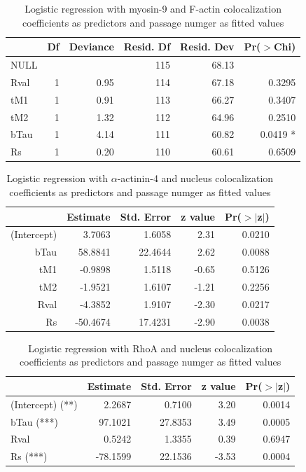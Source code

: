 \documentclass[english,authoryear]{elsarticle}
\begin{document}
\begin{table}[ht]
  \caption{Logistic regression with myosin-9 and F-actin colocalization coefficients as predictors and passage numger as fitted values}
  \label{glm-M9-Fact}
\centering
\begin{tabular}{lrrrrr}
  \hline
 & Df & Deviance & Resid. Df & Resid. Dev & Pr($>$Chi) \\
  \hline
NULL &  &  & 115 & 68.13 &  \\
  Rval & 1 & 0.95 & 114 & 67.18 & 0.3295 \\
  tM1 & 1 & 0.91 & 113 & 66.27 & 0.3407 \\
  tM2 & 1 & 1.32 & 112 & 64.96 & 0.2510 \\
  bTau & 1 & 4.14 & 111 & 60.82 & 0.0419 * \\
  Rs & 1 & 0.20 & 110 & 60.61 & 0.6509 \\
   \hline
\end{tabular}
\end{table}


\begin{table}[ht]
  \caption{Logistic regression with $\alpha$-actinin-4 and nucleus colocalization coefficients as predictors and passage numger as fitted values}
  \label{glm-aA4-nuc}
\centering
\begin{tabular}{rrrrr}
  \hline
 & Estimate & Std. Error & z value & Pr($>$$|$z$|$) \\
  \hline
(Intercept) & 3.7063 & 1.6058 & 2.31 & 0.0210 \\
  bTau & 58.8841 & 22.4644 & 2.62 & 0.0088 \\
  tM1 & -0.9898 & 1.5118 & -0.65 & 0.5126 \\
  tM2 & -1.9521 & 1.6107 & -1.21 & 0.2256 \\
  Rval & -4.3852 & 1.9107 & -2.30 & 0.0217 \\
  Rs & -50.4674 & 17.4231 & -2.90 & 0.0038 \\
   \hline
\end{tabular}
\end{table}

\begin{table}[hb]
  \caption{Logistic regression with RhoA and nucleus colocalization coefficients as predictors and passage numger as fitted values}
  \label{glm-RhoA-nuc}
\centering
\begin{tabular}{l|rrrr}
  \hline
 & Estimate & Std. Error & z value & Pr($>$$|$z$|$) \\
  \hline
(Intercept) (**) & 2.2687 & 0.7100 & 3.20 & 0.0014 \\
  bTau (***) & 97.1021 & 27.8353 & 3.49 & 0.0005 \\
  Rval & 0.5242 & 1.3355 & 0.39 & 0.6947 \\
  Rs (***) & -78.1599 & 22.1536 & -3.53 & 0.0004 \\
   \hline
\end{tabular}
\end{table}
\end{document}
